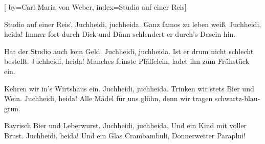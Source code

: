 
[
	by={Carl Maria von Weber},
	index={Studio auf einer Reis}]
  
\beginverse*
Studio auf einer Reis'.
Juchheidi, juchheida.
Ganz famos zu leben weiß.
Juchheidi, heida!
Immer fort durch Dick und Dünn
schlendert er durch's Dasein hin.
\endverse

\beginverse*
Hat der Studio auch kein Geld.
Juchheidi, juchheida.
Ist er drum nicht schlecht bestellt.
Juchheidi, heida!
Manches feinste Pfäffelein,
ladet ihn zum Frühstück ein.
\endverse

\beginverse*
Kehren wir in's Wirtshaus ein.
Juchheidi, juchheida.
Trinken wir stets Bier und Wein.
Juchheidi, heida!
Alle Mädel für uns glühn,
denn wir tragen schwartz-blau-grün.
\endverse

\beginverse*
Bayrisch Bier und Leberwurst.
Juchheidi, juchheida,
Und ein Kind mit voller Brust.
Juchheidi, heida!
Und ein Glas Crambambuli,
Donnerwetter Paraplui!
\endverse
\endsong
